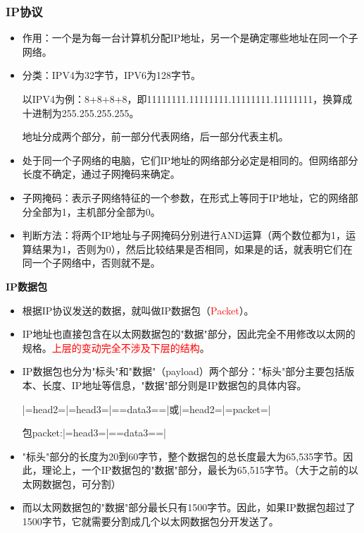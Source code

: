 \documentclass[UTF8]{article}%
\begin{document}
\subsubsection{IP协议}

\begin{itemize}
    \item 作用：一个是为每一台计算机分配IP地址，另一个是确定哪些地址在同一个子网络。
    \item 分类：IPV4为32字节，IPV6为128字节。
    
    以IPV4为例：8+8+8+8，即11111111.11111111.11111111.11111111，换算成十进制为255.255.255.255。

    地址分成两个部分，前一部分代表网络，后一部分代表主机。
    \item 处于同一个子网络的电脑，它们IP地址的网络部分必定是相同的。但网络部分长度不确定，通过子网掩码来确定。
    \item 子网掩码：表示子网络特征的一个参数，在形式上等同于IP地址，它的网络部分全部为1，主机部分全部为0。
    \item 判断方法：将两个IP地址与子网掩码分别进行AND运算（两个数位都为1，运算结果为1，否则为0），然后比较结果是否相同，如果是的话，就表明它们在同一个子网络中，否则就不是。
\end{itemize}

\textbf{IP数据包}

\begin{itemize}
    \item 根据IP协议发送的数据，就叫做IP数据包（\textcolor{red}{Packet}）。
    \item IP地址也直接包含在以太网数据包的"数据"部分，因此完全不用修改以太网的规格。\textcolor{red}{上层的变动完全不涉及下层的结构}。
    \item IP数据包也分为"标头"和"数据"（payload）两个部分："标头"部分主要包括版本、长度、IP地址等信息，"数据"部分则是IP数据包的具体内容。
    
    |=head2=|=head3=|==data3==|或|=head2=|=packet=|
    
    包packet:|=head3=|==data3==|

    \item "标头"部分的长度为20到60字节，整个数据包的总长度最大为65,535字节。因此，理论上，一个IP数据包的"数据"部分，最长为65,515字节。（大于之前的以太网数据包，可分割）
    
    \item 而以太网数据包的"数据"部分最长只有1500字节。因此，如果IP数据包超过了1500字节，它就需要分割成几个以太网数据包分开发送了。

\end{itemize}
\end{document}
